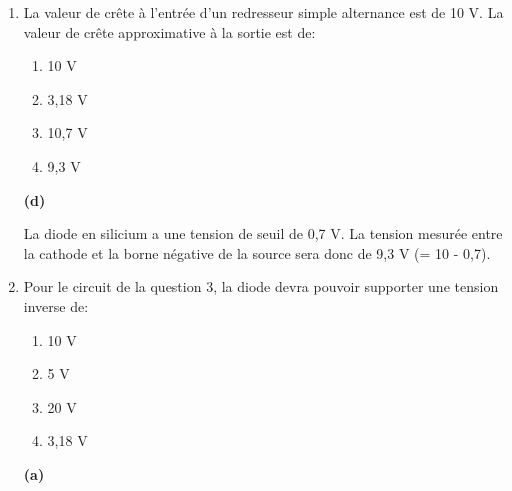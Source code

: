 \documentclass[a4paper]{article}
\begin{document}
\begin{enumerate}
\item La valeur de crête à l’entrée d’un redresseur simple alternance est de 10 V. La valeur de crête approximative à la sortie est de:
\begin{enumerate}
    \item 10 V
    \item 3,18 V
    \item 10,7 V
    \item 9,3 V
\end{enumerate}
\begin{example}
    \textbf{(d)}

    \begin{center}
    \end{center}

    La diode en silicium a une tension de seuil de 0,7 V. La tension mesurée entre la cathode et la borne négative de la source sera donc de 9,3 V (= 10 - 0,7).
\end{example}





\item Pour le circuit de la question 3, la diode devra pouvoir supporter une tension inverse de:
\begin{enumerate}
    \item 10 V
    \item 5 V
    \item 20 V
    \item 3,18 V
\end{enumerate}
\begin{example}
    \textbf{(a)}

    \begin{center}
\end{center}
\end{example}
\end{enumerate}
\end{document}
